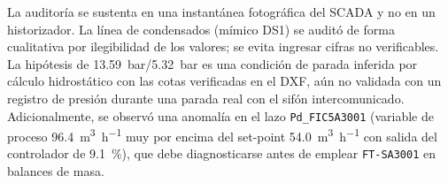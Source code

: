 La auditoría se sustenta en una instantánea fotográfica del SCADA y no en un historizador. La línea de condensados (mímico DS1) se auditó de forma cualitativa por ilegibilidad de los valores; se evita ingresar cifras no verificables. La hipótesis de \SI{13.59}{bar}/\SI{5.32}{bar} es una condición de parada inferida por cálculo hidrostático con las cotas verificadas en el DXF, aún no validada con un registro de presión durante una parada real con el sifón intercomunicado. Adicionalmente, se observó una anomalía en el lazo \texttt{Pd\_FIC5A3001} (variable de proceso \SI{96.4}{\cubic\meter\per\hour} muy por encima del set-point \SI{54.0}{\cubic\meter\per\hour} con salida del controlador de \SI{9.1}{\percent}), que debe diagnosticarse antes de emplear \texttt{FT-SA3001} en balances de masa.
